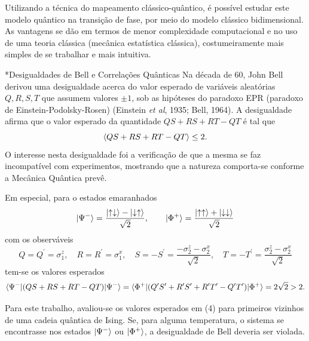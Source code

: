 \documentclass[plainsections, 32pt]{sciposter}
\makeatletter
\newcommand{\largo}{\fontsize{36}{40}\selectfont }
\renewcommand\section{\@startsection {section}{1}{\z@}{-1ex \@plus -0.5ex \@minus -.1ex}{0.8ex \@plus.1ex}{\largo\bfseries\fontsize{28}{26}\selectfont}}
\makeatother
\begin{document}
\begin{multicols}{2}
\vspace{-15mm}
Utilizando a técnica do mapeamento clássico-quântico, é possível estudar este modelo quântico na transição de fase, por meio do modelo clássico bidimensional. As vantagens se dão em termos de menor complexidade computacional e no uso de uma teoria clássica (mecânica estatística clássica), costumeiramente mais simples de se trabalhar e mais intuitiva.

\section*{Desigualdades de Bell e Correlações Quânticas}
\vspace{-3mm}
Na década de 60, John Bell derivou uma desigualdade acerca do valor esperado de variáveis aleatórias $Q, R, S, T$ que assumem valores $\pm 1$, sob as hipóteses do paradoxo EPR (paradoxo de Einstein-Podolsky-Rosen) (Einstein \textit{et al}, 1935; Bell, 1964). A desigualdade afirma que o valor esperado da quantidade $QS + RS + RT - QT$ é tal que
\begin{equation}
  \braket{QS + RS + RT - QT} \leq 2.
\end{equation}
O interesse nesta desigualdade foi a verificação de que a mesma se faz incompatível com experimentos, mostrando que a natureza comporta-se conforme a Mecânica Quântica prevê.

Em especial, para o estados emaranhados
\begin{equation*}
  \ket{\Psi^-} = \frac{\ket{\uparrow \downarrow} - \ket{\downarrow \uparrow}}{\sqrt{2}},
  \qquad
  \ket{\Phi^+} = \frac{\ket{\uparrow \uparrow} + \ket{\downarrow \downarrow}}{\sqrt{2}}
\end{equation*}
com os observáveis
\begin{equation*}
  Q = Q^\prime = \sigma_1^z, \quad R = R^\prime = \sigma_1^x, \quad S = -S^\prime = \frac{-\sigma_2^z - \sigma_2^x}{\sqrt{2}}, \quad T = -T^\prime =  \frac{\sigma_2^z - \sigma_2^x}{\sqrt{2}}
\end{equation*}
tem-se os valores esperados
\begin{equation}
  \braket{\Psi^-|(QS + RS + RT - QT)|\Psi^-} = \braket{\Phi^+|(Q^\prime S^\prime + R^\prime S^\prime + R^\prime T^\prime - Q^\prime T^\prime)|\Phi^+} = 2\sqrt{2}  > 2.
\end{equation}

Para este trabalho, avaliou-se os valores esperados em (4) para primeiros vizinhos de uma cadeia quântica de Ising. Se, para alguma temperatura, o sistema se encontrasse nos estados $\ket{\Psi^-}$ ou $\ket{\Phi^+}$, a desigualdade de Bell deveria ser violada.


\end{multicols}
\end{document}
